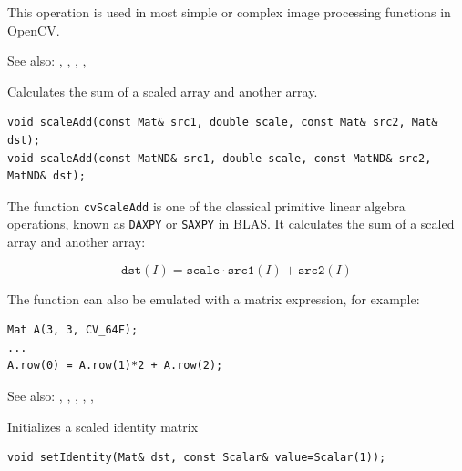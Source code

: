 This operation is used in most simple or complex image processing functions in OpenCV.

See also: , , , , 

\label{scaleAdd}
Calculates the sum of a scaled array and another array.

\begin{lstlisting}
void scaleAdd(const Mat& src1, double scale, const Mat& src2, Mat& dst);
void scaleAdd(const MatND& src1, double scale, const MatND& src2, MatND& dst);
\end{lstlisting}
\begin{description}
\end{description}

The function \texttt{cvScaleAdd} is one of the classical primitive linear algebra operations, known as \texttt{DAXPY} or \texttt{SAXPY} in \href{http://en.wikipedia.org/wiki/Basic_Linear_Algebra_Subprograms}{BLAS}. It calculates the sum of a scaled array and another array:

\[
\texttt{dst}(I)=\texttt{scale} \cdot \texttt{src1}(I) + \texttt{src2}(I)
\]

The function can also be emulated with a matrix expression, for example:

\begin{lstlisting}
Mat A(3, 3, CV_64F);
...
A.row(0) = A.row(1)*2 + A.row(2);
\end{lstlisting}

See also: , , , , , 

\label{setIdentity}
Initializes a scaled identity matrix

\begin{lstlisting}
void setIdentity(Mat& dst, const Scalar& value=Scalar(1));
\end{lstlisting}
\begin{description}
\end{description}

